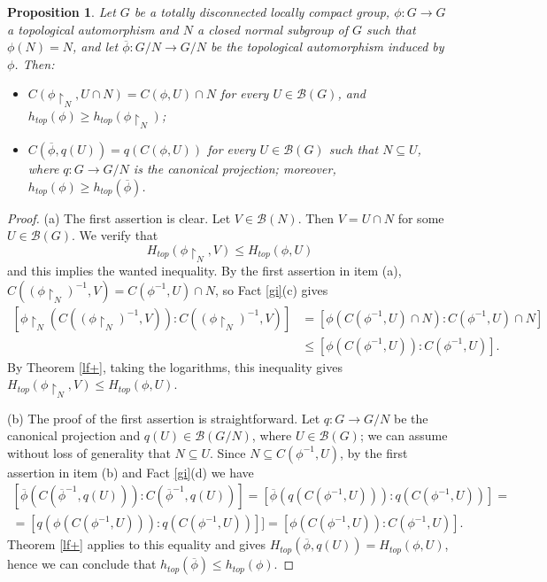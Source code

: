 \documentclass[11pt]{article}
\newtheorem{proposition}[theorem]{Proposition}
\theoremstyle{definition}
\numberwithin{equation}{section}
\begin{document}
\begin{proposition}\label{monotonicity}
Let $G$ be a totally disconnected locally compact group, $\phi:G\to G$ a topological automorphism and $N$ a closed normal subgroup of $G$ such that $\phi(N)=N$, and let $\overline\phi:G/N\to G/N$ be the topological automorphism induced by $\phi$. Then:
\begin{itemize}
\item[(a)] $C(\phi\restriction_N,U\cap N)=C(\phi,U)\cap N$ for every $U\in\mathcal B(G)$, and $h_{top}(\phi)\geq h_{top}(\phi\restriction_N)$;
\item[(b)] $C(\overline\phi,q(U))=q(C(\phi,U))$ for every $U\in\mathcal B(G)$ such that $N\subseteq U$, where $q:G\to G/N$ is the canonical projection; moreover, $h_{top}(\phi)\geq h_{top}(\overline\phi)$.
\end{itemize}
\end{proposition}
\begin{proof}
(a) The first assertion is clear. Let $V\in \mathcal B(N)$. Then $V= U\cap N$ for some $U\in\mathcal B(G)$. We verify that $$H_{top}(\phi\restriction_N,V)\leq H_{top}(\phi,U)$$ and this implies the wanted inequality.
By the first assertion in item (a), $C((\phi\restriction_N)^{-1},V)=C(\phi^{-1},U)\cap N$, so Fact \ref{gi}(c) gives
\begin{equation*}\begin{split}
[\phi\restriction_N(C((\phi\restriction_N)^{-1},V)):C((\phi\restriction_N)^{-1},V)]&=[\phi(C(\phi^{-1},U)\cap N):C(\phi^{-1},U)\cap N]\\&\leq[\phi(C(\phi^{-1},U)):C(\phi^{-1},U)].
\end{split}\end{equation*}
By Theorem \ref{lf+}, taking the logarithms, this inequality gives $H_{top}(\phi\restriction_N,V)\leq H_{top}(\phi,U)$.

\smallskip
(b) The proof of the first assertion is straightforward. Let $q:G\to G/N$ be the canonical projection and $q(U)\in\mathcal B(G/N)$, where $U\in\mathcal B(G)$; we can assume without loss of generality that $N\subseteq U$. Since $N\subseteq C(\phi^{-1},U)$, by the first assertion in item (b) and Fact \ref{gi}(d) we have 
\begin{equation*}\begin{split}
[\overline\phi(C(\overline\phi^{-1},q(U))):C(\overline\phi^{-1},q(U))]=[\overline\phi(q(C(\phi^{-1},U))):q(C(\phi^{-1},U))]=\\
=[q(\phi(C(\phi^{-1},U))):q(C(\phi^{-1},U))]]=[\phi(C(\phi^{-1},U)):C(\phi^{-1},U)].
\end{split}\end{equation*}
Theorem \ref{lf+} applies to this equality and gives $H_{top}(\overline\phi,q(U))=H_{top}(\phi,U)$, hence we can conclude that $h_{top}(\overline\phi)\leq h_{top}(\phi)$.
\end{proof}
\end{document}
